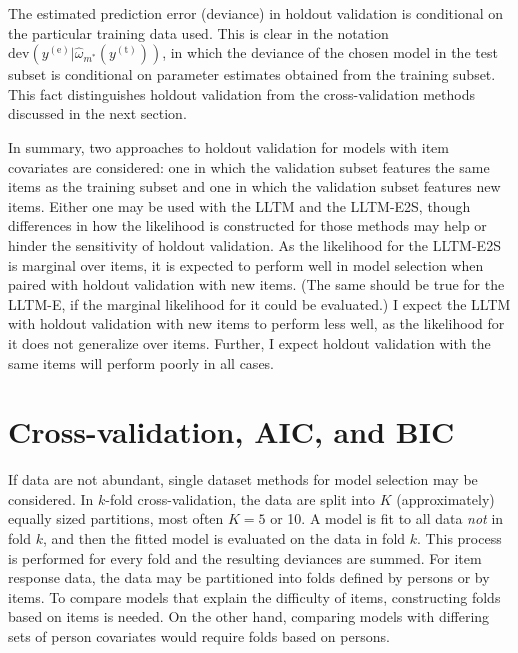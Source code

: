 The estimated prediction error (deviance) in holdout validation is conditional on the particular training data used. This is clear in the notation
	$\mathrm{dev}(y^{(\mathrm{e})} | \hat \omega_{m^*}(y^{(\mathrm{t})}))$, 
in which the deviance of the chosen model in the test subset is conditional on parameter estimates obtained from the training subset.
This fact distinguishes holdout validation from the cross-validation methods discussed in the next section.
		
In summary, two approaches to holdout validation for models with item covariates are considered: one in which the validation subset features the same items as the training subset and one in which the validation subset features new items. Either one may be used with the LLTM and the LLTM-E2S, though differences in how the likelihood is constructed for those methods may help or hinder the sensitivity of holdout validation. As the likelihood for the LLTM-E2S is marginal over items, it is expected to perform well in model selection when paired with holdout validation with new items. (The same should be true for the LLTM-E, if the marginal likelihood for it could be evaluated.) I expect the LLTM with holdout validation with new items to perform less well, as the likelihood for it does not generalize over items. Further, I expect holdout validation with the same items will perform poorly in all cases.


\section{Cross-validation, AIC, and BIC}

If data are not abundant, single dataset methods for model selection may be considered. In $k$-fold cross-validation, the data are split into $K$ (approximately) equally sized partitions, most often $K=5$ or 10. 
A model is fit to all data \emph{not} in fold $k$, and then the fitted model is evaluated on the data in fold $k$. 
This process is performed for every fold and the resulting deviances are summed. For item response data, the data may be partitioned into folds defined by persons or by items.
To compare models that explain the difficulty of items, constructing folds based on items is needed.
On the other hand, comparing models with differing sets of person covariates \parencite[see for example][]{Adams1997b} would require folds based on persons.

